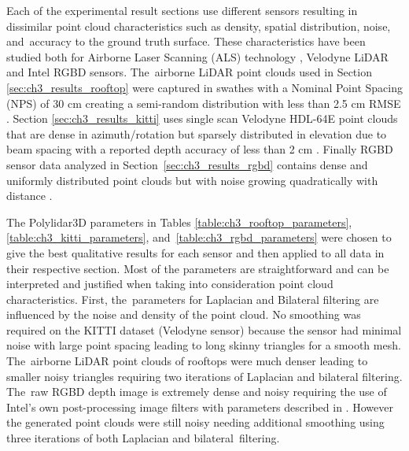 Each of the experimental result sections use different sensors resulting in dissimilar point cloud characteristics such as density, spatial distribution, noise, and~accuracy to the ground truth surface. These characteristics have been studied both for Airborne Laser Scanning (ALS) technology {\cite{balsa-barreiro_airborne_2012, graham_random_2014}}, Velodyne LiDAR {\cite{bergelt_improving_2017}} and Intel \ac{RGBD} {\cite{ahn_analysis_2019}} sensors. The~airborne LiDAR point clouds used in Section {\ref{sec:ch3_results_rooftop}} were captured in swathes with a Nominal Point Spacing (NPS) of 30 cm creating a semi-random distribution with less than 2.5 cm RMSE {\cite{lidar_germany}}. Section {\ref{sec:ch3_results_kitti}} uses single scan Velodyne HDL-64E point clouds that are dense in azimuth/rotation but sparsely distributed in  elevation due to beam spacing with a reported depth accuracy of less than 2 cm {\cite{geiger_vision_2013}}. Finally \ac{RGBD} sensor data analyzed in Section~{\ref{sec:ch3_results_rgbd}} contains dense and uniformly distributed point clouds but with noise growing quadratically with distance {\cite{noauthor_github_2020-4}}.

The Polylidar3D parameters in Tables {\ref{table:ch3_rooftop_parameters}}, {\ref{table:ch3_kitti_parameters}}, and~{\ref{table:ch3_rgbd_parameters}} were chosen to give the best qualitative results for each sensor and then applied to all data in their respective section. Most of the parameters are straightforward and can be interpreted and justified when taking into consideration point cloud characteristics. First, the~parameters for Laplacian and Bilateral filtering are influenced by the noise and density of the point cloud. No smoothing was required on the KITTI dataset (Velodyne sensor) because the sensor had minimal noise with large point spacing leading to long skinny triangles for a smooth mesh. The~airborne LiDAR point clouds of rooftops were much denser leading to smaller noisy triangles requiring two iterations of Laplacian and bilateral filtering. The~raw \ac{RGBD} depth image is extremely dense and noisy requiring the use of Intel's own post-processing image filters with parameters described in {\cite{noauthor_github_2019-1}}. However the generated point clouds were still noisy needing additional smoothing using three iterations of both Laplacian and bilateral~filtering.

